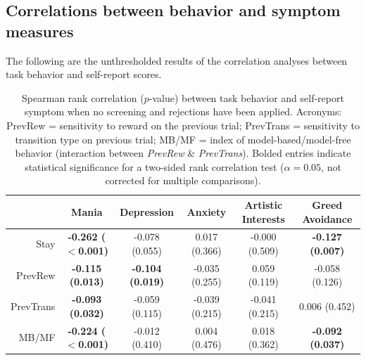 \documentclass[a4paper,notitlepage,12pt]{article}
\begin{document}
\begin{refsection}[supp]
\break
\subsection*{Correlations between behavior and symptom measures}

The following are the unthresholded results of the correlation analyses between task behavior and self-report scores.  

\begin{table}[H]
    \centering
    \begin{adjustbox}{center}   
    \small
    \begin{tabular}{rccccc}
        \toprule
        {} & Mania & Depression & Anxiety & Artistic Interests & Greed Avoidance \\
        \midrule
        Stay      &  \textbf{-0.262 ($<$0.001)} &           -0.078 (0.055) &   0.017 (0.366) &  -0.000 (0.509) &  \textbf{-0.127 (0.007)} \\
        PrevRew   &     \textbf{-0.115 (0.013)} &  \textbf{-0.104 (0.019)} &  -0.035 (0.255) &   0.059 (0.119) &           -0.058 (0.126) \\
        PrevTrans &     \textbf{-0.093 (0.032)} &           -0.059 (0.115) &  -0.039 (0.215) &  -0.041 (0.215) &            0.006 (0.452) \\
        MB/MF     &  \textbf{-0.224 ($<$0.001)} &           -0.012 (0.410) &   0.004 (0.476) &   0.018 (0.362) &  \textbf{-0.092 (0.037)} \\
        \bottomrule
    \end{tabular}
    \end{adjustbox}
    \caption{Spearman rank correlation ($p$-value) between task behavior and self-report symptom when no screening and rejections have been applied. Acronyms: PrevRew = sensitivity to reward on the previous trial; PrevTrans = sensitivity to transition type on previous trial; MB/MF = index of model-based/model-free behavior (interaction between \textit{PrevRew} \& \textit{PrevTrans}). Bolded entries indicate statistical significance for a two-sided rank correlation test ($\alpha = 0.05$, not corrected for multiple comparisons).}
\end{table}


\end{refsection}
\end{document}
